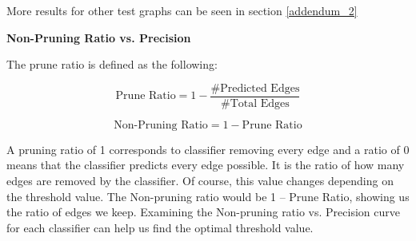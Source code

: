 \documentclass[]{UCD_CS_FYP_Report}
\begin{document}
More results for other test graphs can be seen in section \ref{addendum_2}

\textbf{Non-Pruning Ratio vs. Precision}

The prune ratio is defined as the following:

\begin{equation*}
    \text{Prune Ratio} = 1 - \frac{\# \text{Predicted Edges}}{\# \text{Total Edges}}
\end{equation*}

\begin{equation*}
    \text{Non-Pruning Ratio} = 1 - \text{Prune Ratio}
\end{equation*}

A pruning ratio of 1 corresponds to classifier removing every edge and a ratio of 0 means that the classifier predicts every edge possible. It is the ratio of how many edges are removed by the classifier. Of course, this value changes depending on the threshold value. The Non-pruning ratio would be 1 – Prune Ratio, showing us the ratio of edges we keep. Examining the Non-pruning ratio vs. Precision curve for each classifier can help us find the optimal threshold value.
\end{document}

